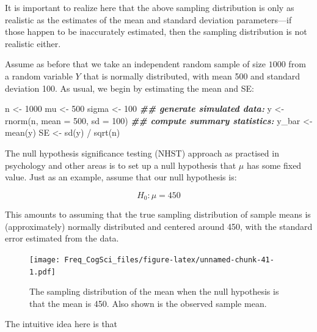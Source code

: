 \documentclass[
  12pt,
]{krantz}
\newenvironment{Shaded}{\begin{snugshade}}{\end{snugshade}}
\newcommand{\AttributeTok}[1]{\textcolor[rgb]{0.77,0.63,0.00}{#1}}
\newcommand{\DecValTok}[1]{\textcolor[rgb]{0.00,0.00,0.81}{#1}}
\newcommand{\DocumentationTok}[1]{\textcolor[rgb]{0.56,0.35,0.01}{\textbf{\textit{#1}}}}
\newcommand{\FunctionTok}[1]{\textcolor[rgb]{0.00,0.00,0.00}{#1}}
\newcommand{\NormalTok}[1]{#1}
\newcommand{\OtherTok}[1]{\textcolor[rgb]{0.56,0.35,0.01}{#1}}
\newcommand{\SpecialCharTok}[1]{\textcolor[rgb]{0.00,0.00,0.00}{#1}}
\theoremstyle{definition}
\theoremstyle{definition}
\theoremstyle{definition}
\theoremstyle{definition}
\theoremstyle{remark}
\begin{document}
It is important to realize here that the above sampling distribution is only as realistic as the estimates of the mean and standard deviation parameters---if those happen to be inaccurately estimated, then the sampling distribution is not realistic either.

Assume as before that we take an independent random sample of size \(1000\) from a random variable \(Y\) that is normally distributed, with mean 500 and standard deviation 100. As usual, we begin by estimating the mean and SE:

\begin{Shaded}
\begin{Highlighting}[]
\NormalTok{n }\OtherTok{\textless{}{-}} \DecValTok{1000}
\NormalTok{mu }\OtherTok{\textless{}{-}} \DecValTok{500}
\NormalTok{sigma }\OtherTok{\textless{}{-}} \DecValTok{100}
\DocumentationTok{\#\# generate simulated data:}
\NormalTok{y }\OtherTok{\textless{}{-}} \FunctionTok{rnorm}\NormalTok{(n, }\AttributeTok{mean =} \DecValTok{500}\NormalTok{, }\AttributeTok{sd =} \DecValTok{100}\NormalTok{)}
\DocumentationTok{\#\# compute summary statistics:}
\NormalTok{y\_bar }\OtherTok{\textless{}{-}} \FunctionTok{mean}\NormalTok{(y)}
\NormalTok{SE }\OtherTok{\textless{}{-}} \FunctionTok{sd}\NormalTok{(y) }\SpecialCharTok{/} \FunctionTok{sqrt}\NormalTok{(n)}
\end{Highlighting}
\end{Shaded}

The null hypothesis significance testing (NHST) approach as practised in psychology and other areas is to set up a null hypothesis that \(\mu\) has some fixed value. Just as an example, assume that our null hypothesis is:

\begin{equation}
H_0: \mu = 450
\end{equation}

This amounts to assuming that the true sampling distribution of sample means is (approximately) normally distributed and centered around 450, with the standard error estimated from the data.

\begin{figure}
\centering
\texttt{[image: Freq\_CogSci\_files/figure-latex/unnamed-chunk-41-1.pdf]}
\caption{\label{fig:unnamed-chunk-41}The sampling distribution of the mean when the null hypothesis is that the mean is 450. Also shown is the observed sample mean.}
\end{figure}

The intuitive idea here is that
\end{document}
